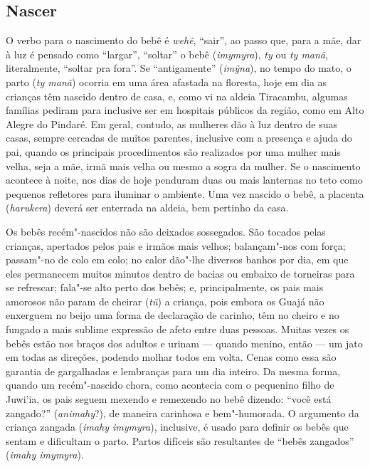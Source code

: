 \subsection{Nascer}

O verbo para o nascimento do bebê é \emph{wehẽ}, ``sair'', ao passo que,
para a mãe, dar à luz é pensado como ``largar'', ``soltar'' o bebê
(\emph{imymyra}), \emph{ty} ou \emph{ty manã}, literalmente, ``soltar pra
fora''. Se ``antigamente'' (\emph{imỹna}), no tempo do mato, o parto
(\emph{ty manã}) ocorria em uma área afastada na floresta, hoje em dia
as crianças têm nascido dentro de casa, e, como vi na aldeia Tiracambu,
algumas famílias pediram para inclusive ser em hospitais públicos da
região, como em Alto Alegre do Pindaré. Em geral, contudo, as mulheres
dão à luz dentro de suas casas, sempre cercadas de muitos parentes,
inclusive com a presença e ajuda do pai, quando os principais
procedimentos são realizados por uma mulher mais velha, seja a mãe, irmã
mais velha ou mesmo a sogra da mulher. Se o nascimento acontece à noite,
nos dias de hoje penduram duas ou mais lanternas no teto como pequenos
refletores para iluminar o ambiente. Uma vez nascido o bebê, a placenta
(\emph{harukera}) deverá ser enterrada na aldeia, bem pertinho da casa.

Os bebês recém"-nascidos não são deixados sossegados. São tocados pelas
crianças, apertados pelos pais e irmãos mais velhos; balançam"-nos com
força; passam"-no de colo em colo; no calor dão"-lhe diversos banhos por
dia, em que eles permanecem muitos minutos dentro de bacias ou embaixo
de torneiras para se refrescar; fala"-se alto perto dos bebês; e,
principalmente, os pais mais amorosos não param de cheirar (\emph{tũ}) a
criança, pois embora os Guajá não enxerguem no beijo uma forma de
declaração de carinho, têm no cheiro e no fungado a mais sublime
expressão de afeto entre duas pessoas. Muitas vezes os bebês estão nos
braços dos adultos e urinam --- quando menino, então --- um jato em todas as
direções, podendo molhar todos em volta. Cenas como essa são garantia de
gargalhadas e lembranças para um dia inteiro. Da mesma forma, quando um
recém"-nascido chora, como acontecia com o pequenino filho de Juwi'ia, os
pais seguem mexendo e remexendo no bebê dizendo: ``você está zangado?''
(\emph{animahy}?), de maneira carinhosa e bem"-humorada. O argumento da
criança zangada (\emph{imahy imymyra}), inclusive, é usado para definir
os bebês que sentam e dificultam o parto. Partos difíceis são
resultantes de ``bebês zangados'' (\emph{imahy imymyra}).

